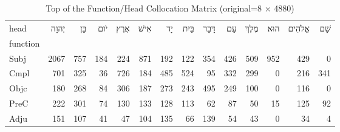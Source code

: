 \begin{table}[htbp!]
\centering
\caption{Top of the Function/Head Collocation Matrix (original=8 × 4880) }
\label{table:colexmatrix}
\begin{adjustbox}{width=1\textwidth}
\begin{tabular}{lrrrrrrrrrrrrr}
\toprule
head &  \texthebrew{יְהוָה} &  \texthebrew{בֵּן} &  \texthebrew{יֹום} &  \texthebrew{אֶרֶץ} &  \texthebrew{אִישׁ} &  \texthebrew{יָד} &  \texthebrew{בַּיִת} &  \texthebrew{דָּבָר} &  \texthebrew{עַם} &  \texthebrew{מֶלֶךְ} &  \texthebrew{הוּא} &  \texthebrew{אֱלֹהִים} &  \texthebrew{שָׁם} \\
function &                      &                    &                    &                     &                     &                   &                      &                      &                   &                      &                    &                        &                    \\
\midrule
Subj     &                 2067 &                757 &                184 &                 224 &                 871 &               192 &                  122 &                  354 &               426 &                  509 &                952 &                    429 &                  0 \\
Cmpl     &                  701 &                325 &                 36 &                 726 &                 184 &               485 &                  524 &                   95 &               332 &                  299 &                  0 &                    216 &                341 \\
Objc     &                  180 &                268 &                 84 &                 306 &                 187 &               273 &                  243 &                  495 &               249 &                  100 &                  0 &                    116 &                  0 \\
PreC     &                  222 &                301 &                 74 &                 130 &                 133 &               128 &                  113 &                   62 &                87 &                   50 &                 15 &                    125 &                 92 \\
Adju     &                  151 &                107 &                 41 &                  47 &                 104 &               135 &                   66 &                  139 &                54 &                   43 &                  0 &                     34 &                  4 \\

\end{tabular}
\end{adjustbox}
\end{table}
